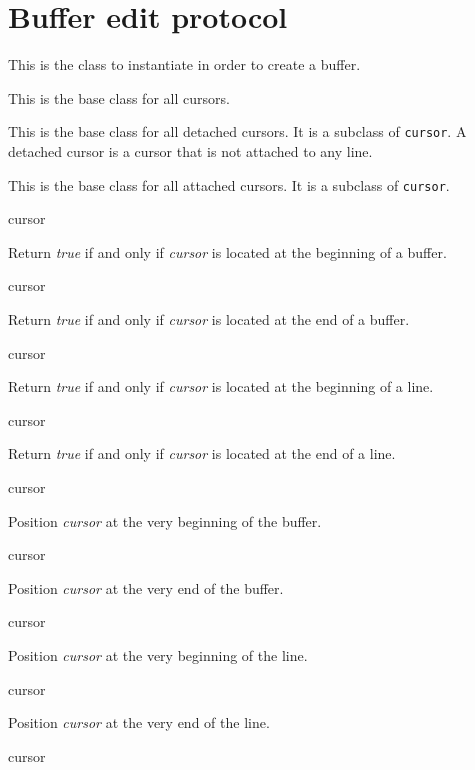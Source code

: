 \chapter{Buffer edit protocol}
\label{chap-edit-protocol}


This is the class to instantiate in order to create a buffer.


This is the base class for all cursors.


This is the base class for all detached cursors.  It is a subclass of
\texttt{cursor}.  A detached cursor is a cursor that is not attached
to any line.


This is the base class for all attached cursors.  It is a subclass of
\texttt{cursor}.

 {cursor}

Return \textit{true} if and only if \textit{cursor} is located at the
beginning of a buffer.

 {cursor}

Return \textit{true} if and only if \textit{cursor} is located at the
end of a buffer.

 {cursor}

Return \textit{true} if and only if \textit{cursor} is located at the
beginning of a line.

 {cursor}

Return \textit{true} if and only if \textit{cursor} is located at the
end of a line.

 {cursor}

Position \textit{cursor} at the very beginning of the buffer.

 {cursor}

Position \textit{cursor} at the very end of the buffer.

 {cursor}

Position \textit{cursor} at the very beginning of the line.

 {cursor}

Position \textit{cursor} at the very end of the line.

 {cursor}

